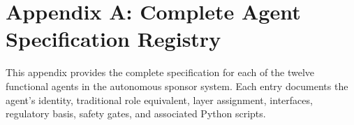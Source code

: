 
\section*{Appendix A: Complete Agent Specification Registry}

This appendix provides the complete specification for each of the twelve functional agents
in the autonomous sponsor system. Each entry documents the agent's identity, traditional
role equivalent, layer assignment, interfaces, regulatory basis, safety gates, and
associated Python scripts.

